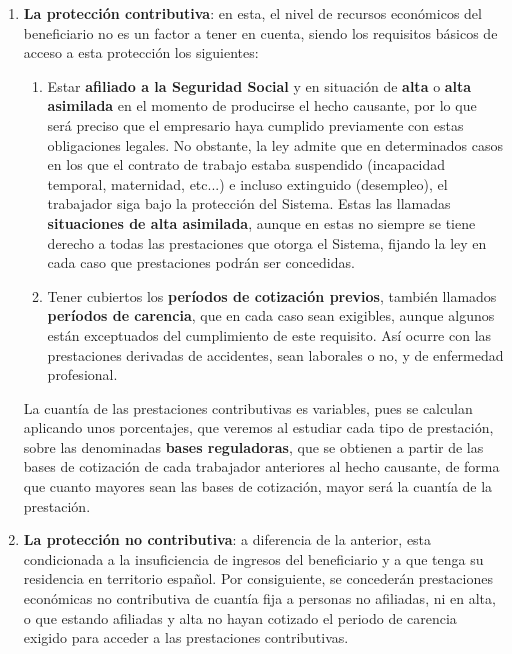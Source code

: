 \begin{enumerate}[label=(\Alph*)]
    \item \textbf{La protección contributiva}: en esta, el nivel de recursos económicos del beneficiario no es un factor a tener en cuenta, siendo los requisitos básicos de acceso a esta protección los siguientes:
    \begin{enumerate}
        \item Estar \textbf{afiliado a la Seguridad Social} y en situación de \textbf{alta} o \textbf{alta asimilada} en el momento de producirse el hecho causante, por lo que será preciso que el empresario haya cumplido previamente con estas obligaciones legales. No obstante, la ley admite que en determinados casos en los que el contrato de trabajo estaba suspendido (incapacidad temporal, maternidad, etc...) e incluso extinguido (desempleo), el trabajador siga bajo la protección del Sistema. Estas las llamadas \textbf{situaciones de alta asimilada}, aunque en estas no siempre se tiene derecho a todas las prestaciones que otorga el Sistema, fijando la ley en cada caso que prestaciones podrán ser concedidas.

        \item Tener cubiertos los \textbf{períodos de cotización previos}, también llamados \textbf{períodos de carencia}, que en cada caso sean exigibles, aunque algunos están exceptuados del cumplimiento de este requisito. Así ocurre con las prestaciones derivadas de accidentes, sean laborales o no, y de enfermedad profesional.
    \end{enumerate}

    La cuantía de las prestaciones contributivas es variables, pues se calculan aplicando unos porcentajes, que veremos al estudiar cada tipo de prestación, sobre las denominadas \textbf{bases reguladoras}, que se obtienen a partir de las bases de cotización de cada trabajador anteriores al hecho causante, de forma que cuanto mayores sean las bases de cotización, mayor será la cuantía de la prestación.

    \item \textbf{La protección no contributiva}: a diferencia de la anterior, esta condicionada a la insuficiencia de ingresos del beneficiario y a que tenga su residencia en territorio español. Por consiguiente, se concederán prestaciones económicas no contributiva de cuantía fija a personas no afiliadas, ni en alta, o que estando afiliadas y alta no hayan cotizado el periodo de carencia exigido para acceder a las prestaciones contributivas.


\end{enumerate}

